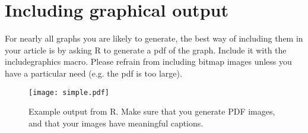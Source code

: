 \documentclass[11pt]{article}
\begin{document}
\clearpage
\section{Including graphical output}

For nearly all graphs you are likely to generate, the best way of
including them in your article is by asking R to generate a pdf of the
graph. Include it with the includegraphics macro.  Please refrain from
including bitmap images unless you have a particular need (e.g. the
pdf is too large).

\begin{figure}
  \centering
  \texttt{[image: simple.pdf]}
  \caption{Example output from R.  Make sure that you generate PDF
    images, and that your images have meaningful captions.}
  \label{fig:example}
\end{figure}
\end{document}
